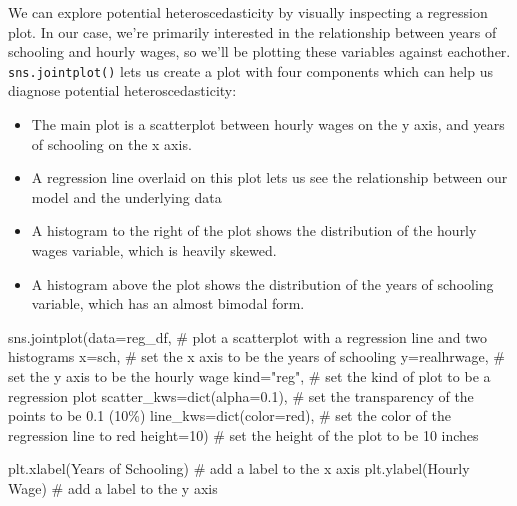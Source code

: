 \documentclass[
  letterpaper,
  DIV=11,
  numbers=noendperiod]{scrreprt}
\newenvironment{Shaded}{\begin{snugshade}}{\end{snugshade}}
\newcommand{\BuiltInTok}[1]{\textcolor[rgb]{0.00,0.23,0.31}{#1}}
\newcommand{\CommentTok}[1]{\textcolor[rgb]{0.37,0.37,0.37}{#1}}
\newcommand{\DecValTok}[1]{\textcolor[rgb]{0.68,0.00,0.00}{#1}}
\newcommand{\FloatTok}[1]{\textcolor[rgb]{0.68,0.00,0.00}{#1}}
\newcommand{\NormalTok}[1]{\textcolor[rgb]{0.00,0.23,0.31}{#1}}
\newcommand{\OperatorTok}[1]{\textcolor[rgb]{0.37,0.37,0.37}{#1}}
\newcommand{\StringTok}[1]{\textcolor[rgb]{0.13,0.47,0.30}{#1}}
\providecommand{\tightlist}{%
  \setlength{\itemsep}{0pt}\setlength{\parskip}{0pt}}\usepackage{longtable,booktabs,array}
\begin{document}
We can explore potential heteroscedasticity by visually inspecting a
regression plot. In our case, we're primarily interested in the
relationship between years of schooling and hourly wages, so we'll be
plotting these variables against eachother. \texttt{sns.jointplot()}
lets us create a plot with four components which can help us diagnose
potential heteroscedasticity:

\begin{itemize}
\tightlist
\item
  The main plot is a scatterplot between hourly wages on the y axis, and
  years of schooling on the x axis.
\item
  A regression line overlaid on this plot lets us see the relationship
  between our model and the underlying data
\item
  A histogram to the right of the plot shows the distribution of the
  hourly wages variable, which is heavily skewed.
\item
  A histogram above the plot shows the distribution of the years of
  schooling variable, which has an almost bimodal form.
\end{itemize}

\begin{Shaded}
\begin{Highlighting}[]
\NormalTok{sns.jointplot(data}\OperatorTok{=}\NormalTok{reg\_df, }\CommentTok{\# plot a scatterplot with a regression line and two histograms}
\NormalTok{                x}\OperatorTok{=}\StringTok{\textquotesingle{}sch\textquotesingle{}}\NormalTok{, }\CommentTok{\# set the x axis to be the years of schooling}
\NormalTok{                y}\OperatorTok{=}\StringTok{\textquotesingle{}realhrwage\textquotesingle{}}\NormalTok{, }\CommentTok{\# set the y axis to be the hourly wage}
\NormalTok{                kind}\OperatorTok{=}\StringTok{"reg"}\NormalTok{,  }\CommentTok{\# set the kind of plot to be a regression plot}
\NormalTok{                scatter\_kws}\OperatorTok{=}\BuiltInTok{dict}\NormalTok{(alpha}\OperatorTok{=}\FloatTok{0.1}\NormalTok{), }\CommentTok{\# set the transparency of the points to be 0.1 (10\%)}
\NormalTok{                line\_kws}\OperatorTok{=}\BuiltInTok{dict}\NormalTok{(color}\OperatorTok{=}\StringTok{\textquotesingle{}red\textquotesingle{}}\NormalTok{), }\CommentTok{\# set the color of the regression line to red}
\NormalTok{                height}\OperatorTok{=}\DecValTok{10}\NormalTok{) }\CommentTok{\# set the height of the plot to be 10 inches }

\NormalTok{plt.xlabel(}\StringTok{\textquotesingle{}Years of Schooling\textquotesingle{}}\NormalTok{) }\CommentTok{\# add a label to the x axis}
\NormalTok{plt.ylabel(}\StringTok{\textquotesingle{}Hourly Wage\textquotesingle{}}\NormalTok{) }\CommentTok{\# add a label to the y axis}
\end{Highlighting}
\end{Shaded}
\end{document}
